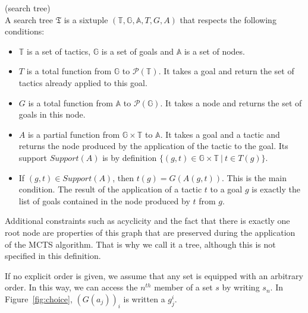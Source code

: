 \documentclass[runningheads,a4paper,draft]{svjour3}
\begin{document}
\begin{definition}(search tree)\\
A search tree $\mathfrak{T}$ is a sixtuple
$(\mathbb{T},\mathbb{G},\mathbb{A},T,G,A)$
that respects the following conditions:
\begin{itemize}
\item $\mathbb{T}$ is a set of tactics, $\mathbb{G}$ is a set of goals
 and $\mathbb{A}$ is a set of nodes.
\item $T$ is a total function from $\mathbb{G}$ to $\mathcal{P}(\mathbb{T})$. It takes a
goal and return the set of tactics already applied to this goal.
\item $G$ is a total function from $\mathbb{A}$ to $\mathcal{P}(\mathbb{G})$. It takes a
node and returns the set of goals in this node.

\item $A$ is a partial function from $\mathbb{G} \times \mathbb{T}$ to
$\mathbb{A}$. It takes a goal and a tactic and returns the node produced by the
application of the tactic to the goal. Its support $\mathit{Support}(A)$ is by 
definition $\lbrace (g,t) \in 
\mathbb{G} \times \mathbb{T}\ |\ t \in T(g)
\rbrace$.
\item If $(g,t) \in \mathit{Support}(A)$, then $t(g) = G(A(g,t))$. This is the 
main condition. The result of the application of a tactic $t$ 
to a goal $g$ is exactly the list of goals contained in the node produced by 
$t$ from 
$g$.
\end{itemize}

Additional constraints such as acyclicity and the fact that there is exactly
one root node are properties of this graph that are preserved during the
application of the MCTS algorithm. That is why we call it a tree, although this
is not specified in this definition.
\end{definition}

If no explicit order is given, we assume that any set is equipped with an
arbitrary order. In this way, we can access the $n^{th}$ member of a set $s$ by
writing $s_n$. In Figure~\ref{fig:choice}, $(G(a_j))_i$ is written a $g_j^i$.
\end{document}
